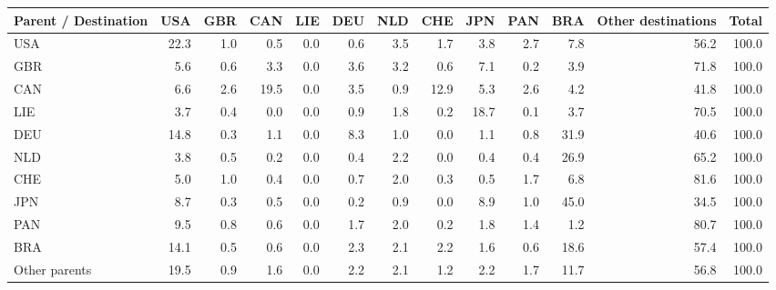 \begin{tabular}{lrrrrrrrrrrrr}
\toprule
Parent / Destination & USA & GBR & CAN & LIE & DEU & NLD & CHE & JPN & PAN & BRA & Other destinations & Total \\
\midrule
USA & 22.3 & 1.0 & 0.5 & 0.0 & 0.6 & 3.5 & 1.7 & 3.8 & 2.7 & 7.8 & 56.2 & 100.0 \\
GBR & 5.6 & 0.6 & 3.3 & 0.0 & 3.6 & 3.2 & 0.6 & 7.1 & 0.2 & 3.9 & 71.8 & 100.0 \\
CAN & 6.6 & 2.6 & 19.5 & 0.0 & 3.5 & 0.9 & 12.9 & 5.3 & 2.6 & 4.2 & 41.8 & 100.0 \\
LIE & 3.7 & 0.4 & 0.0 & 0.0 & 0.9 & 1.8 & 0.2 & 18.7 & 0.1 & 3.7 & 70.5 & 100.0 \\
DEU & 14.8 & 0.3 & 1.1 & 0.0 & 8.3 & 1.0 & 0.0 & 1.1 & 0.8 & 31.9 & 40.6 & 100.0 \\
NLD & 3.8 & 0.5 & 0.2 & 0.0 & 0.4 & 2.2 & 0.0 & 0.4 & 0.4 & 26.9 & 65.2 & 100.0 \\
CHE & 5.0 & 1.0 & 0.4 & 0.0 & 0.7 & 2.0 & 0.3 & 0.5 & 1.7 & 6.8 & 81.6 & 100.0 \\
JPN & 8.7 & 0.3 & 0.5 & 0.0 & 0.2 & 0.9 & 0.0 & 8.9 & 1.0 & 45.0 & 34.5 & 100.0 \\
PAN & 9.5 & 0.8 & 0.6 & 0.0 & 1.7 & 2.0 & 0.2 & 1.8 & 1.4 & 1.2 & 80.7 & 100.0 \\
BRA & 14.1 & 0.5 & 0.6 & 0.0 & 2.3 & 2.1 & 2.2 & 1.6 & 0.6 & 18.6 & 57.4 & 100.0 \\
Other parents & 19.5 & 0.9 & 1.6 & 0.0 & 2.2 & 2.1 & 1.2 & 2.2 & 1.7 & 11.7 & 56.8 & 100.0 \\
\bottomrule
\end{tabular}
